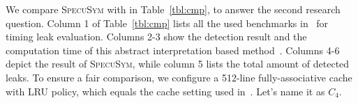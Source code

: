 \documentclass[sigconf]{acmart}
\newcommand{\SpecuSym}{\textsc{SpecuSym} }
\begin{document}
\begin{table}
\caption{Comparison betwee Wu et al.~\cite{WuW19} and \SpecuSym}
\label{tbl:cmp}
\centering
{}
\vspace{-2ex}
\end{table}



We compare \SpecuSym with \cite{WuW19} in Table~\ref{tbl:cmp}, to answer the 
second research question. Column 1 of Table~\ref{tbl:cmp} lists all the used
benchmarks in~\cite{WuW19} for timing leak evaluation. Columns 2-3 show the 
detection result and the computation time of this abstract interpretation 
based method~\cite{WuW19}. Columns 4-6 depict the result of \textsc{SpecuSym}, 
while column 5 lists the total amount of detected leaks. To ensure a fair 
comparison, we configure a 512-line fully-associative cache with LRU policy, 
which equals the cache setting used in~\cite{WuW19}. Let's name it as $C_4$.
\end{document}
